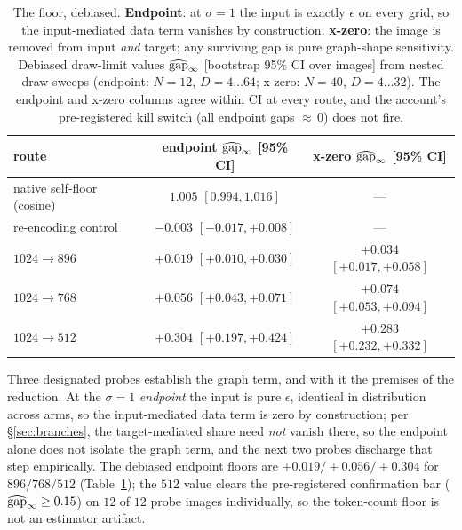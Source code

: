 \begin{table}[t]
\caption{The floor, debiased. \textbf{Endpoint}: at $\sigma{=}1$ the
input is exactly $\epsilon$ on every grid, so the input-mediated data
term vanishes by construction. \textbf{x-zero}: the image is removed
from input \emph{and} target; any surviving gap is pure graph-shape
sensitivity. Debiased draw-limit values $\widehat{\mathrm{gap}}_\infty$ [bootstrap 95\%
CI over images] from nested draw sweeps (endpoint: $N{=}12$,
$D = 4 \ldots 64$; x-zero: $N{=}40$, $D = 4 \ldots 32$). The endpoint
and x-zero columns agree within CI at every route, and the account's
pre-registered kill switch (all endpoint gaps ${\approx}\,0$) does not
fire.}
\label{tab:floor}
\centering
\small
\begin{tabular}{lcc}
\toprule
route & endpoint $\widehat{\mathrm{gap}}_\infty$ [95\% CI] &
x-zero $\widehat{\mathrm{gap}}_\infty$ [95\% CI] \\
\midrule
native self-floor (cosine) & $1.005$ $[0.994, 1.016]$ & --- \\
re-encoding control & $-0.003$ $[-0.017, +0.008]$ & --- \\
$1024{\to}896$ & $+0.019$ $[+0.010, +0.030]$ & $+0.034$ $[+0.017, +0.058]$ \\
$1024{\to}768$ & $+0.056$ $[+0.043, +0.071]$ & $+0.074$ $[+0.053, +0.094]$ \\
$1024{\to}512$ & $+0.304$ $[+0.197, +0.424]$ & $+0.283$ $[+0.232, +0.332]$ \\
\bottomrule
\end{tabular}
\end{table}

Three designated probes
establish the graph term, and with it the premises of the
reduction. At the $\sigma = 1$ \emph{endpoint} the input is pure
$\epsilon$, identical in distribution across arms, so the
input-mediated data term is zero by construction; per
\S\ref{sec:branches}, the target-mediated share need \emph{not} vanish
there, so the endpoint alone does not isolate the graph term, and the
next two probes discharge that step empirically. The debiased endpoint
floors are $+0.019 / +0.056 / +0.304$ for $896/768/512$
(Table~\ref{tab:floor}); the $512$ value clears the pre-registered
confirmation bar ($\widehat{\mathrm{gap}}_\infty \ge 0.15$) on $12$ of $12$ probe images
individually, so the token-count floor is not an estimator artifact.

